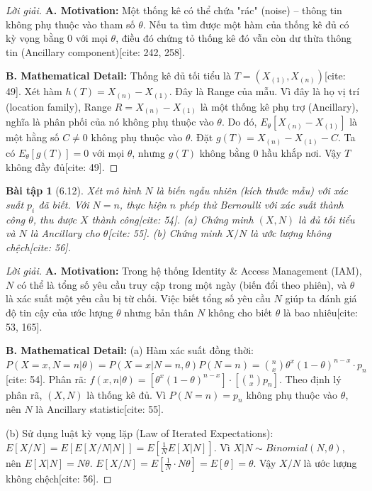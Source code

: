 \documentclass[8pt,a4paper]{article}
\newtheorem{exercise}{Bài tập}
\newenvironment{solution}{\begin{proof}[Lời giải]}{\end{proof}}
\begin{document}
\begin{solution}
\textbf{A. Motivation:} Một thống kê có thể chứa "rác" (noise) – thông tin không phụ thuộc vào tham số $\theta$. Nếu ta tìm được một hàm của thống kê đủ có kỳ vọng bằng 0 với mọi $\theta$, điều đó chứng tỏ thống kê đó vẫn còn dư thừa thông tin (Ancillary component)[cite: 242, 258].

\textbf{B. Mathematical Detail:}
Thống kê đủ tối tiểu là $T = (X_{(1)}, X_{(n)})$[cite: 49].
Xét hàm $h(T) = X_{(n)} - X_{(1)}$. Đây là Range của mẫu. 
Vì đây là họ vị trí (location family), Range $R = X_{(n)} - X_{(1)}$ là một thống kê phụ trợ (Ancillary), nghĩa là phân phối của nó không phụ thuộc vào $\theta$.
Do đó, $E_\theta[X_{(n)} - X_{(1)}]$ là một hằng số $C \neq 0$ không phụ thuộc vào $\theta$.
Đặt $g(T) = X_{(n)} - X_{(1)} - C$. Ta có $E_\theta[g(T)] = 0$ với mọi $\theta$, nhưng $g(T)$ không bằng 0 hầu khắp nơi. 
Vậy $T$ không đầy đủ[cite: 49].
\end{solution}

\begin{exercise}[6.12]
Xét mô hình $N$ là biến ngẫu nhiên (kích thước mẫu) với xác suất $p_i$ đã biết. Với $N=n$, thực hiện $n$ phép thử Bernoulli với xác suất thành công $\theta$, thu được $X$ thành công[cite: 54].
(a) Chứng minh $(X, N)$ là đủ tối tiểu và $N$ là Ancillary cho $\theta$[cite: 55].
(b) Chứng minh $X/N$ là ước lượng không chệch[cite: 56].
\end{exercise}

\begin{solution}
\textbf{A. Motivation:} Trong hệ thống Identity \& Access Management (IAM), $N$ có thể là tổng số yêu cầu truy cập trong một ngày (biến đổi theo phiên), và $\theta$ là xác suất một yêu cầu bị từ chối. Việc biết tổng số yêu cầu $N$ giúp ta đánh giá độ tin cậy của ước lượng $\theta$ nhưng bản thân $N$ không cho biết $\theta$ là bao nhiêu[cite: 53, 165].

\textbf{B. Mathematical Detail:}
(a) Hàm xác suất đồng thời: $P(X=x, N=n | \theta) = P(X=x | N=n, \theta) P(N=n) = \binom{n}{x} \theta^x (1-\theta)^{n-x} \cdot p_n$[cite: 54].
Phân rã: $f(x, n | \theta) = [\theta^x (1-\theta)^{n-x}] \cdot [\binom{n}{x} p_n]$.
Theo định lý phân rã, $(X, N)$ là thống kê đủ. Vì $P(N=n) = p_n$ không phụ thuộc vào $\theta$, nên $N$ là Ancillary statistic[cite: 55].

(b) Sử dụng luật kỳ vọng lặp (Law of Iterated Expectations):
$E[X/N] = E[ E[X/N | N] ] = E[ \frac{1}{N} E[X|N] ]$.
Vì $X|N \sim Binomial(N, \theta)$, nên $E[X|N] = N\theta$.
$E[X/N] = E[ \frac{1}{N} \cdot N\theta ] = E[\theta] = \theta$.
Vậy $X/N$ là ước lượng không chệch[cite: 56].
\end{solution}
\end{document}
